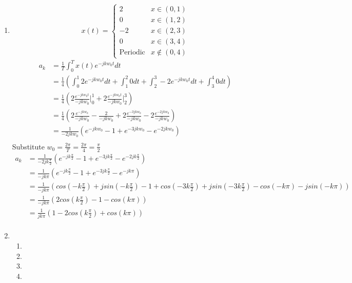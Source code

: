 \documentclass[10pt,a4paper, margin=1in]{article}
\begin{document}
\begin{enumerate}
\item
\[ x(t) = \begin{cases}
        2 & x \in (0, 1) \\
        0 & x \in (1, 2) \\
        -2 & x \in (2, 3) \\
        0 & x \in (3, 4) \\
        \text{Periodic} & x \notin (0, 4)
\end{cases}\]
\begin{align*}
    a_k &= \frac{1}{T} \int_{0}^{T} x(t) e^{-jkw_0t} dt \\
    &= \frac{1}{4} (\int_{0}^{1} 2e^{-jkw_0t} dt + \int_{1}^{2} 0 dt + \int_{2}^{3} -2 e^{-jkw_0t} dt + \int_{3}^{4} 0 dt) \\
    &= \frac{1}{4} (2\frac{e^{-jkw_0t}}{-jkw_0} \Big|_{0}^{1} + 2\frac{e^{-jkw_0t}}{-jkw_0} \Big|_{2}^{3}) \\
    &= \frac{1}{4} (2\frac{e^{-jkw_0}}{-jkw_0} - \frac{2}{-jkw_0} + 2\frac{e^{-3jkw_0}}{-jkw_0} - 2\frac{e^{-2jkw_0}}{-jkw_0}) \\
    &= \frac{1}{-2jkw_0} (e^{-jkw_0} - 1 + e^{-3jkw_0} - e^{-2jkw_0}) \\
\end{align*}
Substitute $w_0 = \frac{2\pi}{T} = \frac{2\pi}{4} = \frac{\pi}{2}$\\

\begin{align*}
    a_k &= \frac{1}{-2jk\frac{\pi}{2}} (e^{-jk\frac{\pi}{2}} - 1 + e^{-3jk\frac{\pi}{2}} - e^{-2jk\frac{\pi}{2}}) \\
    &= \frac{1}{-jk\pi} (e^{-jk\frac{\pi}{2}} - 1 + e^{-3jk\frac{\pi}{2}} - e^{-jk\pi}) \\
    &= \frac{1}{-jk\pi} (cos(-k\frac{\pi}{2}) + jsin(-k\frac{\pi}{2}) - 1 + cos(-3k\frac{\pi}{2}) + jsin(-3k\frac{\pi}{2}) - cos(-k\pi) - jsin(-k\pi)) \\
    &= \frac{1}{-jk\pi} (2cos(k\frac{\pi}{2}) - 1 - cos(k\pi)) \\
    &= \frac{1}{jk\pi} (1 - 2cos(k\frac{\pi}{2}) + cos(k\pi)) \\
\end{align*}


\item %
    \begin{enumerate}   
    \item %
    \item %
	\item %
    \item %
    \end{enumerate}


\end{enumerate}
\end{document}
